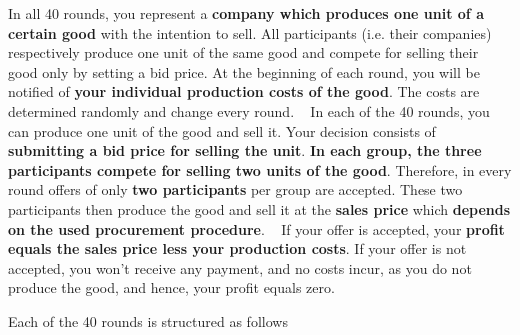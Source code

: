 \documentclass[11pt]{article}
\begin{document}

In all 40 rounds, you represent a \textbf{company which produces one unit of a certain good} with the intention to sell. All participants (i.e. their companies) respectively produce one unit of the same good and compete for selling their good only by setting a bid price. At the beginning of each round, you will be notified of \textbf{your individual production costs of the good}. The costs are determined randomly and change every round. ~\bigbreak
In each of the 40 rounds, you can produce one unit of the good and sell it. Your decision consists of \textbf{submitting a bid price for selling the unit}. \textbf{In each group, the three participants compete for selling two units of the good}. Therefore, in every round offers of only \textbf{two participants} per group are accepted. These two participants then produce the good and sell it at the \textbf{sales price} which \textbf{depends on the used procurement procedure}. ~\bigbreak
If your offer is accepted, your \textbf{profit equals the sales price less your production costs}. If your offer is not accepted, you won't receive any payment, and no costs incur, as you do not produce the good, and hence, your profit equals zero.



Each of the 40 rounds is structured as follows
\end{document}
